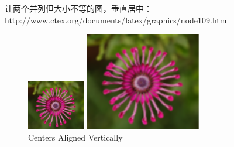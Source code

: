 \documentclass{article}
\begin{document}
\begin{CJK}{UTF8}{gbsn}
让两个并列但大小不等的图，垂直居中：http://www.ctex.org/documents/latex/graphics/node109.html
\begin{figure} 
	\centering 
	\begin{minipage}[c]{0.5\textwidth} 
		\centering 
		\includegraphics[width=1in]{imgs/flower1.png} 
	\end{minipage}%
	\begin{minipage}[c]{0.5\textwidth} 
		\centering 
		\includegraphics[width=2in]{imgs/flower1.png} 
	\end{minipage} 
	\caption{Centers Aligned Vertically} 
\end{figure}





\end{CJK}
\end{document}
